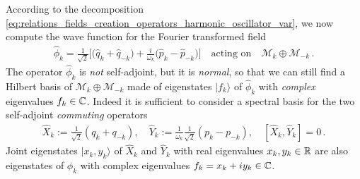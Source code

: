 \documentclass[../QFT_main.tex]{subfiles}
\begin{document}
\begin{mytheorem}
According to the decomposition \eqref{eq:relations_fields_creation_operators_harmonic_oscillator_var}, we now compute the wave function for the Fourier transformed field 
\begin{align}
    \hat{\phi}_k=\tfrac{1}{\sqrt{2}}\Big[ \big(\hat{q}_k+\hat{q}_{-k}\big) + \tfrac{i}{\omega_k}\big(\hat{p}_k - \hat{p}_{-k}\big) \Big]\quad \text{acting on}\quad \mathcal{M}_k\oplus \mathcal{M}_{-k}\,.
\end{align}
%
The operator $\hat{\phi}_k$ is \emph{not} self-adjoint, but it is \emph{normal}, so that we can still find a Hilbert basis of  $\mathcal{M}_k\oplus \mathcal{M}_{-k}$ made of eigenstates $|f_k\rangle$ of $\hat{\phi}_k$ with \emph{complex} eigenvalues $f_k\in\mathbb{C}$.
%
Indeed it is sufficient to consider a spectral basis for the two self-adjoint \emph{commuting} operators
\begin{align}
    \hat{X}_k := \frac{1}{\sqrt{2}} ({q}_k + {q}_{-k} ), \quad
    \hat{Y}_k := \frac{1}{\omega_k}\frac{1}{\sqrt{2}} ({p}_k - {p}_{-k} ), \quad
    [\hat{X}_k, \hat{Y}_k]=0\,.
\end{align}
Joint eigenstates $|x_k, y_k\rangle$ of $\hat{X}_k$ and $\hat{Y}_k$ with real eigenvalues $x_k, y_k\in\mathbb{R}$ are also eigenstates of $\phi_k$ with complex eigenvalues $f_k = x_k + i y_k\in\mathbb{C}$.
%


\end{mytheorem}
\end{document}
